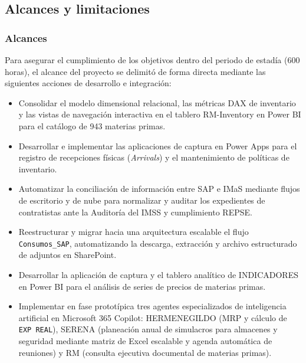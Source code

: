 \subsection{Alcances y limitaciones} \label{sec:alcances_limitaciones} %

\subsubsection{Alcances} \label{subsec:alcances}

Para asegurar el cumplimiento de los objetivos dentro del periodo de estadía (600 horas), el alcance del proyecto se delimitó de forma directa mediante las siguientes acciones de desarrollo e integración:

\begin{itemize}
    \item Consolidar el modelo dimensional relacional, las métricas DAX de inventario y las vistas de navegación interactiva en el tablero RM-Inventory en Power BI para el catálogo de 943 materias primas.
    \item Desarrollar e implementar las aplicaciones de captura en Power Apps para el registro de recepciones físicas (\emph{Arrivals}) y el mantenimiento de políticas de inventario.
    \item Automatizar la conciliación de información entre SAP e IMaS mediante flujos de escritorio y de nube para normalizar y auditar los expedientes de contratistas ante la Auditoría del IMSS y cumplimiento REPSE.
    \item Reestructurar y migrar hacia una arquitectura escalable el flujo \texttt{Consumos\_SAP}, automatizando la descarga, extracción y archivo estructurado de adjuntos en SharePoint.
    \item Desarrollar la aplicación de captura y el tablero analítico de INDICADORES en Power BI para el análisis de series de precios de materias primas.
    \item Implementar en fase prototípica tres agentes especializados de inteligencia artificial en Microsoft 365 Copilot: HERMENEGILDO (MRP y cálculo de \texttt{EXP REAL}), SERENA (planeación anual de simulacros para almacenes y seguridad mediante matriz de Excel escalable y agenda automática de reuniones) y RM (consulta ejecutiva documental de materias primas).
\end{itemize}

